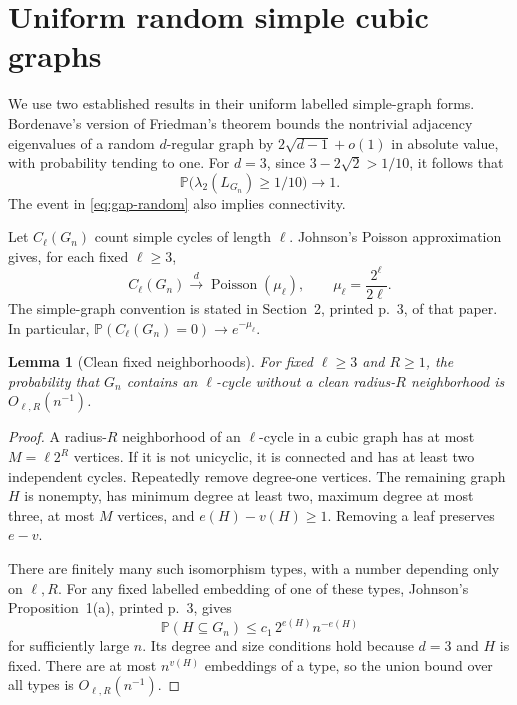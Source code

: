 \documentclass[11pt]{article}
\newtheorem{lemma}[theorem]{Lemma}
\theoremstyle{definition}
\theoremstyle{remark}
\newcommand{\Pp}{\mathbb P}
\begin{document}
\section{Uniform random simple cubic graphs}

We use two established results in their uniform labelled simple-graph forms.
Bordenave's version of Friedman's theorem
\cite[Theorem~1, printed p.~2]{bordenave} bounds the nontrivial adjacency
eigenvalues of a random $d$-regular graph by
$2\sqrt{d-1}+o(1)$ in absolute value, with probability tending to one.
For $d=3$, since $3-2\sqrt2>1/10$, it follows that
\begin{equation}\label{eq:gap-random}
 \Pp\bigl(\lambda_2(L_{G_n})\ge1/10\bigr)\longrightarrow1.
\end{equation}
The event in \eqref{eq:gap-random} also implies connectivity.

Let $C_\ell(G_n)$ count simple cycles of length $\ell$. Johnson's
Poisson approximation \cite[Theorem~11, printed p.~12]{johnson} gives,
for each fixed $\ell\ge3$,
\begin{equation}\label{eq:poisson}
 C_\ell(G_n)\xrightarrow{\ d\ }\operatorname{Poisson}(\mu_\ell),
 \qquad \mu_\ell=\frac{2^\ell}{2\ell}.
\end{equation}
The simple-graph convention is stated in Section~2, printed p.~3, of that
paper. In particular, $\Pp(C_\ell(G_n)=0)\to e^{-\mu_\ell}$.

\begin{lemma}[Clean fixed neighborhoods]\label{lem:clean-random}
For fixed $\ell\ge3$ and $R\ge1$, the probability that $G_n$ contains an
$\ell$-cycle without a clean radius-$R$ neighborhood is
$O_{\ell,R}(n^{-1})$.
\end{lemma}

\begin{proof}
A radius-$R$ neighborhood of an $\ell$-cycle in a cubic graph has at most
$M=\ell2^R$ vertices. If it is not unicyclic, it is connected and has at
least two independent cycles. Repeatedly remove degree-one vertices. The
remaining graph $H$ is nonempty, has minimum degree at least two, maximum
degree at most three, at most $M$ vertices, and
$e(H)-v(H)\ge1$. Removing a leaf preserves $e-v$.

There are finitely many such isomorphism types, with a number depending
only on $\ell,R$. For any fixed labelled embedding of one of these types,
Johnson's Proposition~1(a), printed p.~3, gives
\[
 \Pp(H\subseteq G_n)\le c_1\,2^{e(H)} n^{-e(H)}
\]
for sufficiently large $n$. Its degree and size conditions hold because
$d=3$ and $H$ is fixed. There are at most $n^{v(H)}$ embeddings of a type,
so the union bound over all types is $O_{\ell,R}(n^{-1})$.
\end{proof}
\end{document}
